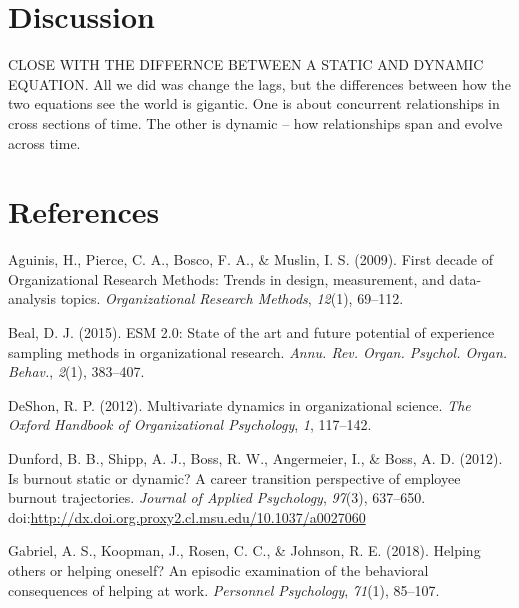 \documentclass[english,,man]{apa6}
\theoremstyle{definition}
\theoremstyle{definition}
\theoremstyle{definition}
\theoremstyle{remark}
\begin{document}
\hypertarget{discussion}{%
\section{Discussion}\label{discussion}}

CLOSE WITH THE DIFFERNCE BETWEEN A STATIC AND DYNAMIC EQUATION. All we
did was change the lags, but the differences between how the two
equations see the world is gigantic. One is about concurrent
relationships in cross sections of time. The other is dynamic -- how
relationships span and evolve across time.

\newpage

\hypertarget{references}{%
\section{References}\label{references}}

\setlength{\parindent}{-0.5in}
\setlength{\leftskip}{0.5in}

\hypertarget{refs}{}
\leavevmode\hypertarget{ref-aguinis_first_2009}{}%
Aguinis, H., Pierce, C. A., Bosco, F. A., \& Muslin, I. S. (2009). First
decade of Organizational Research Methods: Trends in design,
measurement, and data-analysis topics. \emph{Organizational Research
Methods}, \emph{12}(1), 69--112.

\leavevmode\hypertarget{ref-beal_esm_2015}{}%
Beal, D. J. (2015). ESM 2.0: State of the art and future potential of
experience sampling methods in organizational research. \emph{Annu. Rev.
Organ. Psychol. Organ. Behav.}, \emph{2}(1), 383--407.

\leavevmode\hypertarget{ref-deshon_multivariate_2012}{}%
DeShon, R. P. (2012). Multivariate dynamics in organizational science.
\emph{The Oxford Handbook of Organizational Psychology}, \emph{1},
117--142.

\leavevmode\hypertarget{ref-dunford_is_2012}{}%
Dunford, B. B., Shipp, A. J., Boss, R. W., Angermeier, I., \& Boss, A.
D. (2012). Is burnout static or dynamic? A career transition perspective
of employee burnout trajectories. \emph{Journal of Applied Psychology},
\emph{97}(3), 637--650.
doi:\href{https://doi.org/http://dx.doi.org.proxy2.cl.msu.edu/10.1037/a0027060}{http://dx.doi.org.proxy2.cl.msu.edu/10.1037/a0027060}

\leavevmode\hypertarget{ref-gabriel_helping_2018}{}%
Gabriel, A. S., Koopman, J., Rosen, C. C., \& Johnson, R. E. (2018).
Helping others or helping oneself? An episodic examination of the
behavioral consequences of helping at work. \emph{Personnel Psychology},
\emph{71}(1), 85--107.
\end{document}
